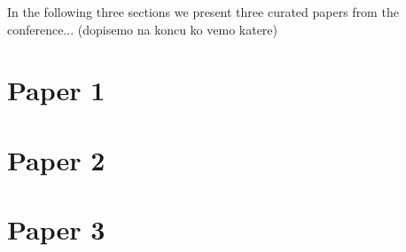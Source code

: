 \documentclass[
	a4paper, %
	10pt, %
	unnumberedsections, %
	twoside, %
]{LTJournalArticle}
\begin{document}
In the following three sections we present three curated papers from the conference... (dopisemo na koncu ko vemo katere)


\section{Paper 1}



\section{Paper 2}




\section{Paper 3}




\printbibliography %

\end{document}
